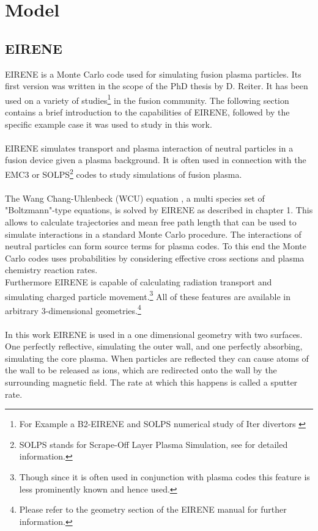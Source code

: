 \chapter{Model}
	\label{Chap:Model}
	\section{EIRENE}
		EIRENE is a Monte Carlo code used for simulating fusion plasma particles. Its first version was written in the scope of the PhD thesis by D. Reiter. It has been used on a variety of studies\footnote{For Example a B2-EIRENE and SOLPS numerical study of Iter divertors \cite{EirStudy} } in the fusion community. The following section contains a brief introduction to the capabilities of EIRENE, followed by the specific example case it was used to study in this work.\\
		~\\
		EIRENE simulates transport and plasma interaction of neutral particles in a fusion device given a plasma background. It is often used in connection with the EMC3 or SOLPS\footnote{SOLPS stands for Scrape-Off Layer Plasma Simulation, see \cite{SOLPS} for detailed information.} codes to study simulations of fusion plasma.\\
		~\\
		The Wang Chang-Uhlenbeck (WCU) equation \cite{WCU}, a multi species set of "Boltzmann"-type equations, is solved by EIRENE as described in \cite{EIRENE} chapter 1. This allows to calculate trajectories and mean free path length that can be used to simulate interactions in a standard Monte Carlo procedure. The interactions of neutral particles can form source terms for plasma codes. To this end the Monte Carlo codes uses probabilities by considering effective cross sections and plasma chemistry reaction rates.\\
		Furthermore EIRENE is capable of calculating radiation transport and simulating charged particle movement.\footnote{Though since it is often used in conjunction with plasma codes this feature is less prominently known and hence used.} All of these features are available in arbitrary 3-dimensional geometries.\footnote{Please refer to the geometry section of the EIRENE manual \cite{EIRENE} for further information.}\\
		~\\
		In this work EIRENE is used in a one dimensional geometry with two surfaces. One perfectly reflective, simulating the outer wall, and one perfectly absorbing, simulating the core plasma. When particles are reflected they can cause atoms of the wall to be released as ions, which are redirected onto the wall by the surrounding magnetic field. The rate at which this happens is called a sputter rate.\\
